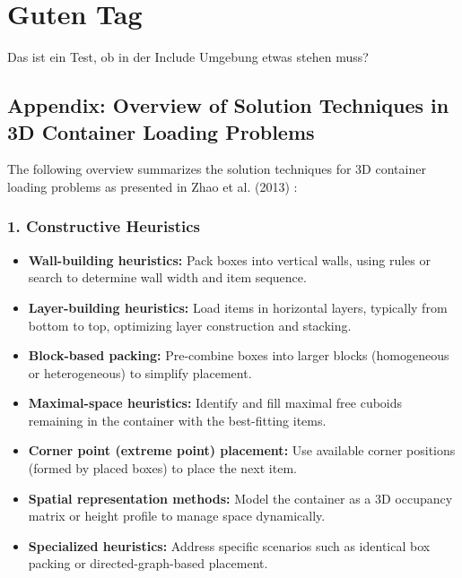 
\chapter{Guten Tag}

Das ist ein Test, ob in der Include Umgebung etwas stehen muss?

\section*{Appendix: Overview of Solution Techniques in 3D Container Loading Problems}

The following overview summarizes the solution techniques for 3D container loading problems as presented in Zhao et al. (2013) \cite{zhao_comparative_2016}:

\subsection*{1. Constructive Heuristics}
\begin{itemize}
    \item \textbf{Wall-building heuristics:} Pack boxes into vertical walls, using rules or search to determine wall width and item sequence.
    \item \textbf{Layer-building heuristics:} Load items in horizontal layers, typically from bottom to top, optimizing layer construction and stacking.
    \item \textbf{Block-based packing:} Pre-combine boxes into larger blocks (homogeneous or heterogeneous) to simplify placement.
    \item \textbf{Maximal-space heuristics:} Identify and fill maximal free cuboids remaining in the container with the best-fitting items.
    \item \textbf{Corner point (extreme point) placement:} Use available corner positions (formed by placed boxes) to place the next item.
    \item \textbf{Spatial representation methods:} Model the container as a 3D occupancy matrix or height profile to manage space dynamically.
    \item \textbf{Specialized heuristics:} Address specific scenarios such as identical box packing or directed-graph-based placement.
\end{itemize}

